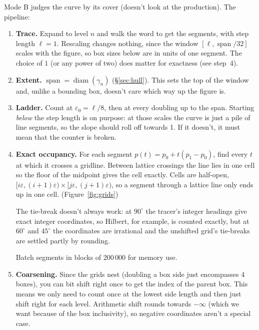 \documentclass[11pt, a4paper]{article}
\theoremstyle{plain}
\theoremstyle{definition}
\theoremstyle{remark}
\DeclareMathOperator{\diam}{diam}
\newcommand{\eps}{\varepsilon}
\begin{document}
Mode B judges the curve by its cover (doesn't look at the production). The pipeline:

\begin{enumerate}
    \item \textbf{Trace.} Expand to level $n$ and walk the word to get the
    segments, with step length $\ell=1$. Rescaling changes nothing, since the
    window $[\ell,\operatorname{span}/32]$ scales with the figure, so box sizes
    below are in units of one segment. The choice of $1$ (or any power of two)
    does matter for exactness (see step~4).

    \item \textbf{Extent.} $\operatorname{span}=\diam(\gamma_n)$
    (\S\ref{sec:hull}). This sets the top of the window and, unlike a bounding
    box, doesn't care which way up the figure is.

    \item \textbf{Ladder.} Count at $\eps_0=\ell/8$, then at every doubling up
    to the span. Starting \emph{below} the step length is on purpose: at those
    scales the curve is just a pile of line segments, so the slope should roll
    off towards 1. If it doesn't, it must mean that the counter is broken.

    \item \textbf{Exact occupancy.} For each segment $p(t)=p_0+t(p_1-p_0)$,
    find every $t$ at which it crosses a gridline. Between lattice crossings the line lies in one cell so the floor of the midpoint gives the cell exactly.
    Cells are half-open, $[i\eps,(i+1)\eps)\times[j\eps,(j+1)\eps)$, so a segment through a lattice line only ends up in one cell. (Figure~\ref{fig:grids})

    The tie-break doesn't always work: at $90^\circ$ the tracer's
    integer headings give exact integer coordinates, so Hilbert, for example, is counted exactly, but at $60^\circ$
    and $45^\circ$ the coordinates are irrational and the unshifted grid's tie-breaks are settled partly by rounding.

    Batch segments in blocks of $200\,000$ for memory use.

    \item \textbf{Coarsening.} Since the grids nest (doubling a box side just encompasses 4 boxes), you can bit shift right once to get the index of the parent box.
    This means we only need to count once at the lowest side length and then just shift right for each level.
    Arithmetic shift rounds towards $-\infty$ (which we want because of the box inclusivity), so negative coordinates aren't a special case.


\end{enumerate}
\end{document}
